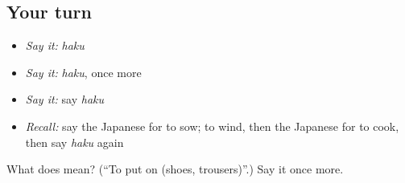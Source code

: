 \subsection*{Your turn}
\begin{itemize}
\raggedright
  \item \emph{Say it:} \emph{haku}
  \item \emph{Say it:} \emph{haku}, once more
  \item \emph{Say it:} say \emph{haku}
  \item \emph{Recall:} say the Japanese for to sow; to wind, then the Japanese for to cook, then say \emph{haku} again
\end{itemize}

\begin{tcolorbox}[breakable,colback=teal!4,colframe=teal!35!black,title={Before you move on}]
What does  mean? (\textquotedblleft{}To put on (shoes, trousers)\textquotedblright{}.) Say it once more.
\end{tcolorbox}
